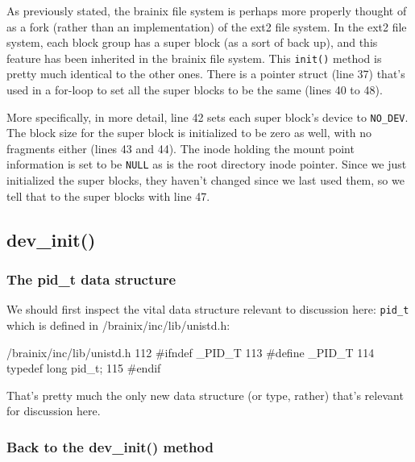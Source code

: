 As previously stated, the brainix file system is perhaps more properly thought of as a fork (rather than an implementation) of the ext2 file system. In the ext2 file system, each block group has a super block (as a sort of back up), and this feature has been inherited in the brainix file system. This \verb|init()| method is pretty much identical to the other ones. There is a pointer struct (line 37) that's used in a for-loop to set all the super blocks to be the same (lines 40 to 48).

More specifically, in more detail, line 42 sets each super block's device to \verb|NO_DEV|. The block size for the super block is initialized to be zero as well, with no fragments either (lines 43 and 44). The inode holding the mount point information is set to be \verb|NULL| as is the root directory inode pointer. Since we just initialized the super blocks, they haven't changed since we last used them, so we tell that to the super blocks with line 47.

\subsection{dev\_init()}

\subsubsection{The pid\_t data structure}

We should first inspect the vital data structure relevant to discussion here: \verb|pid_t| which is defined in /brainix/inc/lib/unistd.h:\marginpar[pid\_t]{}
\begin{code}{/brainix/inc/lib/unistd.h}
112 #ifndef _PID_T
113 #define _PID_T
114 typedef long pid_t;
115 #endif
\end{code}
That's pretty much the only new data structure (or type, rather) that's relevant for discussion here.

\subsubsection{Back to the dev\_init() method}

